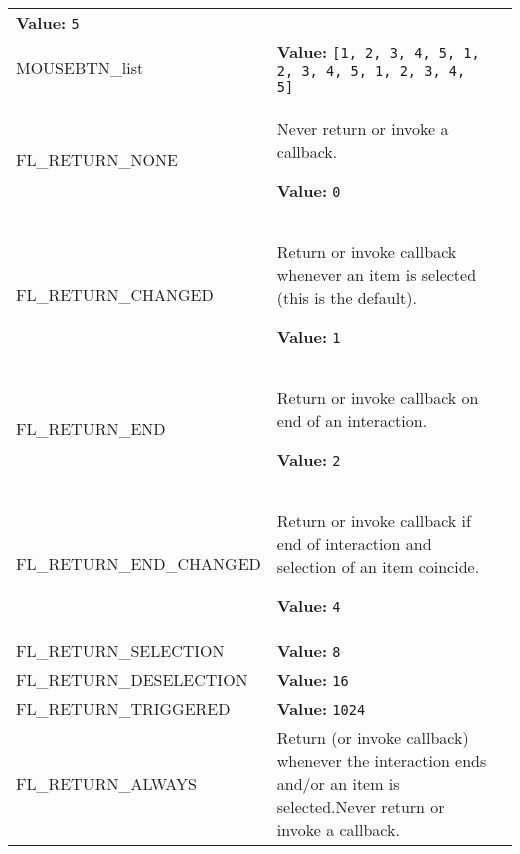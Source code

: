 \begin{longtable}{|p{\varnamewidth}|p{\vardescrwidth}|l}
\textbf{Value:} 
{\tt 5}&\\
\cline{1-2}
\raggedright M\-O\-U\-S\-E\-B\-T\-N\-\_\-l\-i\-s\-t\- & \raggedright \textbf{Value:} 
{\tt \texttt{[}1\texttt{, }2\texttt{, }3\texttt{, }4\texttt{, }5\texttt{, }1\texttt{, }2\texttt{, }3\texttt{, }4\texttt{, }5\texttt{, }1\texttt{, }2\texttt{, }3\texttt{, }4\texttt{, }5\texttt{]}}&\\
\cline{1-2}
\raggedright F\-L\-\_\-R\-E\-T\-U\-R\-N\-\_\-N\-O\-N\-E\- & \raggedright Never return or invoke a callback.

\textbf{Value:} 
{\tt 0}&\\
\cline{1-2}
\raggedright F\-L\-\_\-R\-E\-T\-U\-R\-N\-\_\-C\-H\-A\-N\-G\-E\-D\- & \raggedright Return or invoke callback whenever an item is selected (this is 
          the default).

\textbf{Value:} 
{\tt 1}&\\
\cline{1-2}
\raggedright F\-L\-\_\-R\-E\-T\-U\-R\-N\-\_\-E\-N\-D\- & \raggedright Return or invoke callback on end of an interaction.

\textbf{Value:} 
{\tt 2}&\\
\cline{1-2}
\raggedright F\-L\-\_\-R\-E\-T\-U\-R\-N\-\_\-E\-N\-D\-\_\-C\-H\-A\-N\-G\-E\-D\- & \raggedright Return or invoke callback if end of interaction and selection of 
          an item coincide.

\textbf{Value:} 
{\tt 4}&\\
\cline{1-2}
\raggedright F\-L\-\_\-R\-E\-T\-U\-R\-N\-\_\-S\-E\-L\-E\-C\-T\-I\-O\-N\- & \raggedright \textbf{Value:} 
{\tt 8}&\\
\cline{1-2}
\raggedright F\-L\-\_\-R\-E\-T\-U\-R\-N\-\_\-D\-E\-S\-E\-L\-E\-C\-T\-I\-O\-N\- & \raggedright \textbf{Value:} 
{\tt 16}&\\
\cline{1-2}
\raggedright F\-L\-\_\-R\-E\-T\-U\-R\-N\-\_\-T\-R\-I\-G\-G\-E\-R\-E\-D\- & \raggedright \textbf{Value:} 
{\tt 1024}&\\
\cline{1-2}
\raggedright F\-L\-\_\-R\-E\-T\-U\-R\-N\-\_\-A\-L\-W\-A\-Y\-S\- & \raggedright Return (or invoke callback) whenever the interaction ends and/or 
          an item is selected.Never return or invoke a callback.


\end{longtable}
